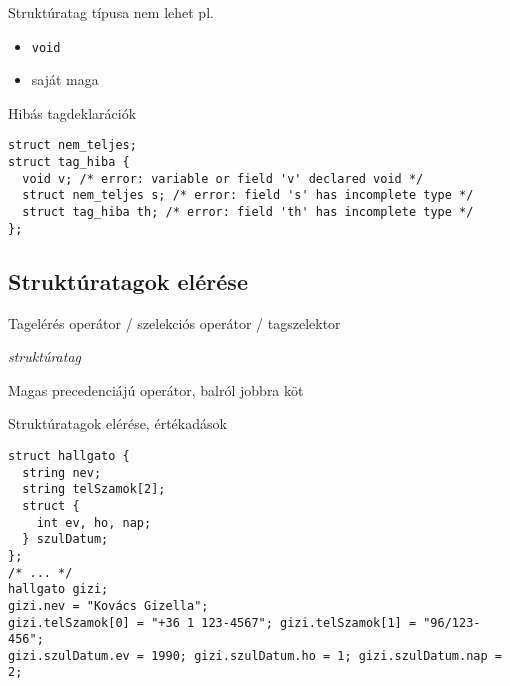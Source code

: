 \documentclass[usenames,dvipsnames,aspectratio=169]{beamer}
\begin{document}
\begin{frame}[fragile]
  Struktúratag típusa nem lehet pl.
  \begin{itemize}
    \item \texttt{void}
    \item saját maga
  \end{itemize}
  \begin{alertblock}{Hibás tagdeklarációk}
    \vspace{-.2cm}
    \begin{verbatim}
struct nem_teljes;
struct tag_hiba {
  void v; /* error: variable or field 'v' declared void */
  struct nem_teljes s; /* error: field 's' has incomplete type */
  struct tag_hiba th; /* error: field 'th' has incomplete type */
};
\end{verbatim}
    \vspace{-.2cm}
  \end{alertblock}
\end{frame}

\subsection{Struktúratagok elérése}
\begin{frame}[fragile]
  Tagelérés operátor / szelekciós operátor / tagszelektor
  \begin{compactitem}
    \item \emph{struktúratag}
    \item Magas precedenciájú operátor, balról jobbra köt
  \end{compactitem}
  \scriptsize
  \begin{exampleblock}{Struktúratagok elérése, értékadások}
    \vspace{-.2cm}
    \begin{verbatim}
struct hallgato {
  string nev;
  string telSzamok[2];
  struct {
    int ev, ho, nap;
  } szulDatum;
};
/* ... */
hallgato gizi;
gizi.nev = "Kovács Gizella";
gizi.telSzamok[0] = "+36 1 123-4567"; gizi.telSzamok[1] = "96/123-456";
gizi.szulDatum.ev = 1990; gizi.szulDatum.ho = 1; gizi.szulDatum.nap = 2;
\end{verbatim}
    \vspace{-.2cm}
  \end{exampleblock}
\end{frame}

\end{document}
